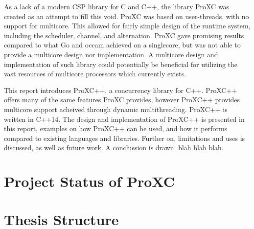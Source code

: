 As a lack of a modern CSP library for C and C++, the library ProXC was created as an attempt to fill this void. ProXC was based on user-threads, with no support for multicore. This allowed for fairly simple design of the runtime system, including the scheduler, channel, and alternation. ProXC gave promising results compared to what Go and occam achieved on a singlecore, but was not able to provide a multicore design nor implementation. A multicore design and implementation of such library could potentially be beneficial for utilizing the vast resources of multicore processors which currently exists. 

This report introduces ProXC++, a concurrency library for C++. ProXC++ offers many of the same features ProXC provides, however ProXC++ provides multicore support acheived through dynamic multithreading. ProXC++ is written in C++14. The design and implementation of ProXC++ is presented in this report, examples on how ProXC++ can be used, and how it performs compared to existing languages and libraries. Further on, limitations and uses is discussed, as well as future work. A conclussion is drawn.  blah blah blah.


\section{Project Status of ProXC}


\section{Thesis Structure}